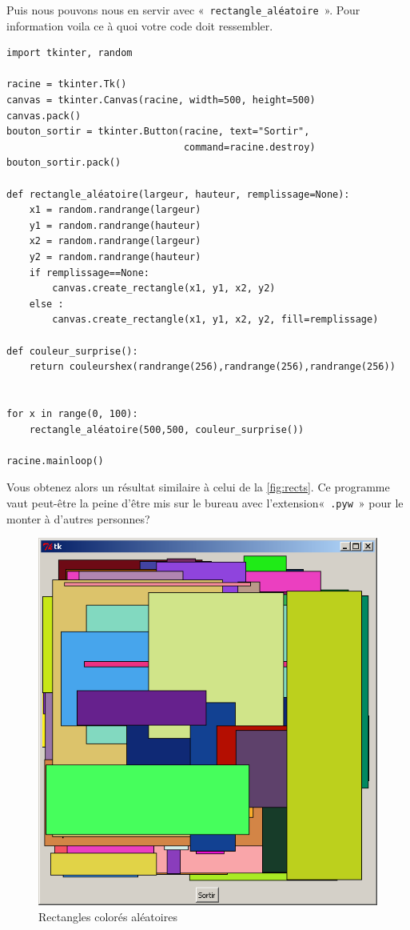 Puis nous pouvons nous en servir avec «~\texttt{rectangle\_aléatoire}~». Pour information voila ce à quoi votre code doit ressembler.

\begin{Verbatim}[frame=single,rulecolor=\color{mbleu}, label=à taper]
import tkinter, random

racine = tkinter.Tk()
canvas = tkinter.Canvas(racine, width=500, height=500)
canvas.pack()
bouton_sortir = tkinter.Button(racine, text="Sortir",
                               command=racine.destroy)
bouton_sortir.pack()

def rectangle_aléatoire(largeur, hauteur, remplissage=None):
    x1 = random.randrange(largeur)
    y1 = random.randrange(hauteur)
    x2 = random.randrange(largeur)
    y2 = random.randrange(hauteur)
    if remplissage==None:
        canvas.create_rectangle(x1, y1, x2, y2)
    else :	
        canvas.create_rectangle(x1, y1, x2, y2, fill=remplissage)

def couleur_surprise():
    return couleurshex(randrange(256),randrange(256),randrange(256))


for x in range(0, 100):
    rectangle_aléatoire(500,500, couleur_surprise())

racine.mainloop()
\end{Verbatim}

Vous obtenez alors un résultat similaire à celui de la \autoref{fig:rects}. Ce programme vaut peut-être la peine d'être mis sur le bureau avec l'extension«~\texttt{.pyw}~» pour le monter à d'autres personnes?
\begin{figure}[h!]
\centering
\includegraphics[scale=0.4]{images/rectangles2}
\caption{Rectangles colorés aléatoires}\label{fig:rects}
\end{figure}

